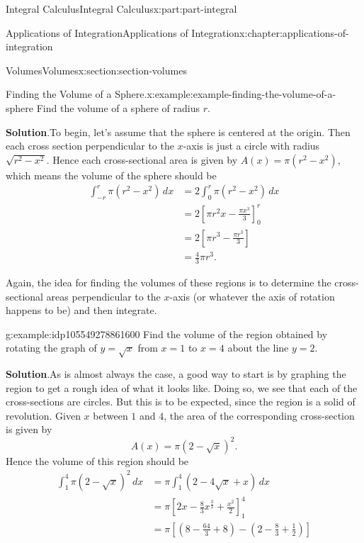 \documentclass[twoside,10pt,]{book}
\newcommand{\blocktitlefont}{\relax}
\numberwithin{equation}{part}
\newcommand{\amp}{&}
\begin{document}
\begin{partptx}{Integral Calculus}{}{Integral Calculus}{}{}{x:part:part-integral}
\begin{chapterptx}{Applications of Integration}{}{Applications of Integration}{}{}{x:chapter:applications-of-integration}
\begin{sectionptx}{Volumes}{}{Volumes}{}{}{x:section:section-volumes}
\begin{example}{Finding the Volume of a Sphere.}{x:example:example-finding-the-volume-of-a-sphere}
Find the volume of a sphere of radius \(r\).%
\par\smallskip%
\noindent\textbf{\blocktitlefont Solution}.\hypertarget{g:solution:idp105549278858016}{}\quad{}To begin, let's assume that the sphere is centered at the origin. Then each cross section perpendicular to the \(x\)-axis is just a circle with radius \(\sqrt{r^{2} - x^{2}}\). Hence each cross-sectional area is given by \(A(x) = \pi(r^{2} - x^{2})\), which means the volume of the sphere should be%
\begin{align*}
\int_{-r}^{r}\pi(r^{2} - x^{2})\,dx \amp= 2\int_{0}^{r}\pi(r^{2} - x^{2})\,dx\\
\amp= 2\left[\pi r^{2}x - \frac{\pi x^{3}}{3}\right]_{0}^{r}\\
\amp= 2\left[\pi r^{3} - \frac{\pi r^{3}}{3}\right]\\
\amp= \frac{4}{3}\pi r^{3}.
\end{align*}
%
\end{example}
Again, the idea for finding the volumes of these regions is to determine the cross-sectional areas perpendicular to the \(x\)-axis (or whatever the axis of rotation happens to be) and then integrate.%
\begin{example}{}{g:example:idp105549278861600}%
Find the volume of the region obtained by rotating the graph of \(y = \sqrt{x}\) from \(x = 1\) to \(x = 4\) about the line \(y = 2\).%
\par\smallskip%
\noindent\textbf{\blocktitlefont Solution}.\hypertarget{g:solution:idp105549278863648}{}\quad{}As is almost always the case, a good way to start is by graphing the region to get a rough idea of what it looks like. Doing so, we see that each of the cross-sections are circles. But this is to be expected, since the region is a solid of revolution. Given \(x\) between \(1\) and \(4\), the area of the corresponding cross-section is given by%
\begin{equation*}
A(x) = \pi(2 - \sqrt{x})^{2}.
\end{equation*}
Hence the volume of this region should be%
\begin{align*}
\int_{1}^{4}\pi(2 - \sqrt{x})^{2}\,dx \amp= \pi\int_{1}^{4}(2 - 4\sqrt{x} + x)\,dx\\
\amp= \pi\left[2x - \frac{8}{3}x^{\frac{3}{2}} + \frac{x^{2}}{2}\right]_{1}^{4}\\
\amp= \pi\left[\left(8 - \frac{64}{3} + 8\right) - \left(2 - \frac{8}{3} + \frac{1}{2}\right)\right]
\end{align*}
%
\end{example}

\end{sectionptx}
\end{chapterptx}
\end{partptx}
\end{document}
